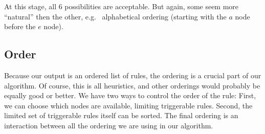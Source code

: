 \documentclass[a4paper]{article}
\newcommand*{\say}[1]{``{#1}''}
\newcommand*{\eg}{e.g.\ }
\begin{document}
At this stage, all 6 possibilities are acceptable.
But again, some seem more \say{natural} then the other,
\eg{} alphabetical ordering (starting with the $a$ node before the $e$ node).


\subsection{Order}\label{sec:order}

Because our output is an ordered list of rules, the ordering is a crucial part of our algorithm.
Of course, this is all heuristics, and other orderings would probably be equally good or better.
We have two ways to control the order of the rule:
First, we can choose which nodes are available, limiting triggerable rules.
Second, the limited set of triggerable rules itself can be sorted.
The final ordering is an interaction between all the ordering we are using in our algorithm.
\end{document}
